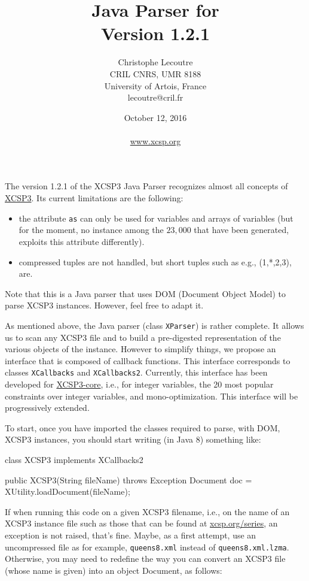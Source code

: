 \documentclass[10pt]{article}
\title{\textcolor{dred}{Java Parser for \xt}\\ \textcolor{dred}{Version 1.2.1}}
\author{Christophe Lecoutre \\
CRIL CNRS, UMR 8188\\ University of Artois, France \\
lecoutre@cril.fr
}
\date{October 12, 2016\\~ \\\href{www.xcsp.org}{www.xcsp.org}}
\newenvironment{boxabsc}
               {\medskip \begin{bclogo}[barre=none,arrondi=0.2,logo=]{}\vspace{-0.6cm}}
               {\vspace{-0.1cm}\end{bclogo} \smallskip}
\def\xt{{\rm XCSP3}\xspace}
\newcommand{\att}[1]{{\tt #1}} %
\newcommand{\nn}[1]{{\tt #1}} %
\begin{document}
\maketitle


The version 1.2.1 of the \xt Java Parser recognizes almost all concepts of \href{http://xcsp.org/format3.pdf}{\xt}.
Its current limitations are the following:
\begin{itemize}
\item the attribute \att{as} can only be used for variables and arrays of variables (but for the moment, no instance among the $23,000$ that have been generated, exploits this attribute differently).
\item compressed tuples are not handled, but short tuples such as e.g., (1,*,2,3), are.
\end{itemize}


\bigskip
Note that this is a Java parser that uses DOM (Document Object Model) to parse XCSP3 instances.
However, feel free to adapt it. %

\bigskip
As mentioned above, the Java parser (class \nn{XParser}) is rather complete.
It allows us to scan any XCSP3 file and to build a pre-digested representation of the various objects of the instance.
However to simplify things, we propose an interface that is composed of callback functions.
This interface corresponds to classes  \nn{XCallbacks} and \nn{XCallbacks2}.
Currently, this interface has been developed for \href{http://xcsp.org/specifications}{XCSP3-core}, i.e., for integer variables, the 20 most popular constraints over integer variables, and mono-optimization.
This interface will be progressively extended.

\bigskip
To start, once you have imported the classes required to parse, with DOM, \xt instances, 
you should start writing (in Java 8) something like:

\begin{boxabsc}
\begin{absc}
class XCSP3 implements XCallbacks2 { 

  public XCSP3(String fileName) throws Exception {
    Document doc = XUtility.loadDocument(fileName);
  }
}  
\end{absc} 
\end{boxabsc}

If when running this code on a given XCSP3 filename, i.e., on the name of an XCSP3 instance file such as those that can be found at \href{http://xcsp.org/series}{xcsp.org/series}, an exception is not raised, that's fine.
Maybe, as a first attempt, use an uncompressed file as for example, \nn{queens8.xml} instead of  \nn{queens8.xml.lzma}.
Otherwise, you may need to redefine the way you can convert an XCSP3 file (whose name is given) into an object Document, as follows:
\end{document}
